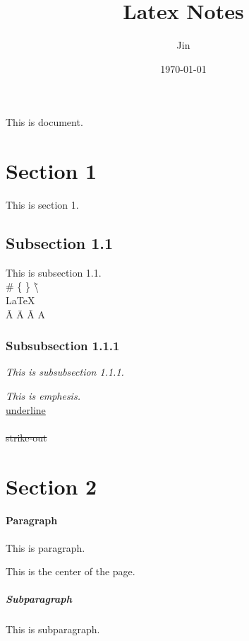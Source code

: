 \documentclass{article}
\title{Latex Notes}
\author{Jin}
\date{\today}
\begin{document}
\maketitle
\tableofcontents %

This is document.
\section{Section 1}
\Large{This} \small{is} section 1.

\subsection{Subsection 1.1}
This is subsection 1.1. \\
\# \{ \} \~ \textbackslash \\
\LaTeX \\
\v{A} \={A} \~{A} \textcircled{A}

\subsubsection{Subsubsection 1.1.1}
\textit{This is subsubsection 1.1.1.}  
\begin{spacing}{1.3}
    \emph{This is emphesis.} \\
    \uline{underline} \\
     \\
    \sout{strike-out}
\end{spacing}


\newpage
\section{Section 2}

\paragraph{Paragraph}

\begin{flushleft}
    This is paragraph.
\end{flushleft}

\begin{center}
    This is the center of the page.
\end{center}


\subparagraph{Subparagraph} 
This is subparagraph.
\end{document}
